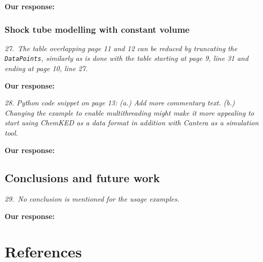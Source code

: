 \documentclass[a4paper,10pt]{elsarticle}
\begin{document}
\textbf{Our response:}


\subsubsection*{Shock tube modelling with constant volume}

\textit{27.~The table overlapping page 11 and 12 can be reduced by truncating the \texttt{DataPoints}, similarly as is done with the table starting at page 9, line 31 and ending at page 10, line 27.}

\textbf{Our response:}

\textit{28. Python code snippet on page 13: (a.) Add more commentary text. (b.) Changing the example to enable multithreading might make it more appealing to start using ChemKED as a data format in addition with Cantera as a simulation tool.}

\textbf{Our response:}


\subsection*{Conclusions and future work}

\textit{29.~No conclusion is mentioned for the usage examples.}

\textbf{Our response:}

\section*{References}


\end{document}
